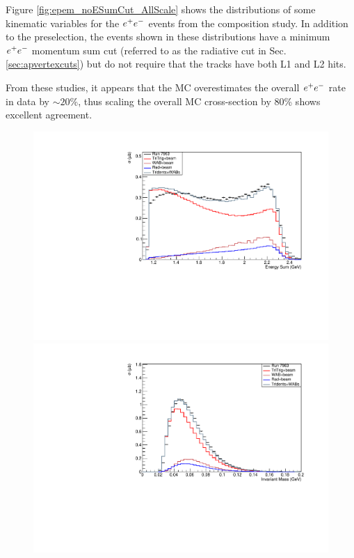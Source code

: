 Figure \ref{fig:epem_noESumCut_AllScale} shows the distributions of some kinematic variables for the $e^{+}e^{-}$ events from the composition study.  In addition to the preselection, the events shown in these distributions have a minimum $e^{+}e^{-}$ momentum sum cut (referred to as the radiative cut in Sec. \ref{sec:apvertexcuts}) but do not require that the tracks have both L1 and L2 hits.  

From these studies, it appears that the MC overestimates the overall $e^{+}e^{-}$ rate in data by $\sim20$\%, thus scaling the overall MC cross-section by 80\% shows excellent agreement. 

\begin{figure}[tbhp]
        \centering
      \includegraphics[scale=0.35]{figs/recon/xs-norm-data-EpEmTB-eSum-intruns-NoESumCut_pre-vertex-intplots.pdf}
      \includegraphics[scale=0.35]{figs/recon/xs-norm-data-EpEmTB-pairMass-intruns-NoESumCut_pre-vertex-intplots.pdf}

\end{figure}
